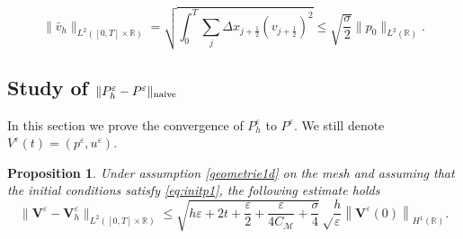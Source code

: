 \documentclass[a4paper,french,english,10pt]{article}
\newcommand\eps{\varepsilon}
\newcommand\V{\mathbf{V}}
\newtheorem{proposition}[theorem]{Proposition}
\begin{document}
\begin{equation}\label{l2}
 \|\bar{v}_{h}\|_{L^2([0,T]\times\mathbb{R})}
=
\sqrt{
\int_0^T \sum_j \Delta x_{j+\frac12} (v_{j+\frac12} )^2
}
\leq
\sqrt{\frac{\sigma}{2}} \|p_0\|_{L^2(\mathbb R)}.
\end{equation}

\subsection{Study of $\| P_h^\varepsilon - P^\varepsilon   \|_{ {\rm naive}}$}


In this section we  
prove the 
convergence of $P_h^\varepsilon $ to  $P^\varepsilon $. We still denote $V^\eps(t)=(p^\eps,u^\eps)$.
\begin{proposition}\label{cv1d}
Under assumption \ref{geometrie1d} on the mesh and assuming that the initial conditions satisfy \eqref{eq:initp1}, the following estimate holds 
\begin{equation*}
\|\V^{\eps}-\V^{\eps}_h \|_{L^2([0,T]\times \mathbb{R})}
\leq \sqrt{h\eps + 2t + \frac{\eps}{2} + \frac{\eps}{4C_{\mathcal{M}}} + \frac{\sigma}{4} }
\sqrt \frac{h}\eps 
\left\| \V^{\eps}(0)
\right\|_{H^1(\mathbb{R})}.
\end{equation*}

\end{proposition}
\end{document}
